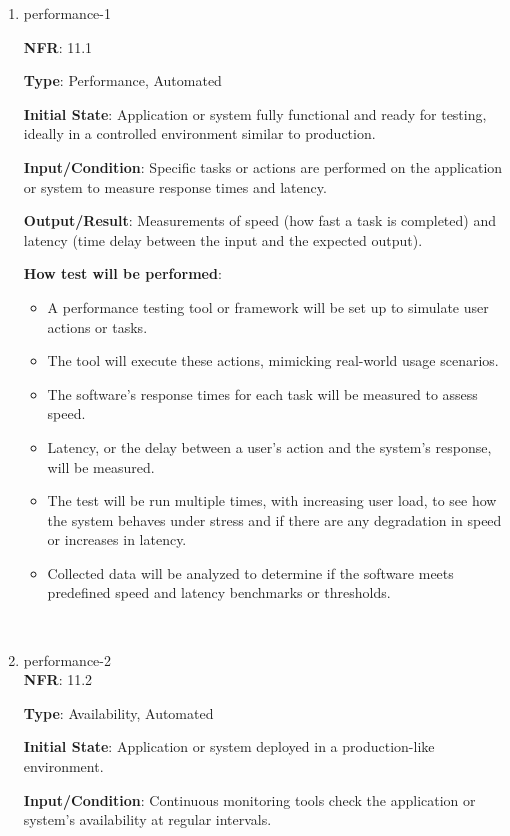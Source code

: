 \documentclass[12pt, titlepage]{article}
\begin{document}
\begin{enumerate}

\item{performance-1\\}

\textbf{NFR}: 11.1

\textbf{Type}: Performance, Automated

\textbf{Initial State}: Application or system fully functional and ready for testing, ideally in a controlled environment similar to production.

\textbf{Input/Condition}: Specific tasks or actions are performed on the application or system to measure response times and latency.

\textbf{Output/Result}: Measurements of speed (how fast a task is completed) and latency (time delay between the input and the expected output).

\textbf{How test will be performed}: 
\begin{itemize}[noitemsep]
    \item A performance testing tool or framework will be set up to simulate user actions or tasks.
    \item The tool will execute these actions, mimicking real-world usage scenarios.
    \item The software's response times for each task will be measured to assess speed.
    \item Latency, or the delay between a user's action and the system's response, will be measured.
    \item The test will be run multiple times, with increasing user load, to see how the system behaves under stress and if there are any degradation in speed or increases in latency.
    \item Collected data will be analyzed to determine if the software meets predefined speed and latency benchmarks or thresholds.
\end{itemize}\\

\item{performance-2 \\}
\textbf{NFR}: 11.2

\textbf{Type}: Availability, Automated

\textbf{Initial State}: Application or system deployed in a production-like environment.

\textbf{Input/Condition}: Continuous monitoring tools check the application or system's availability at regular intervals.


\end{enumerate}
\end{document}
